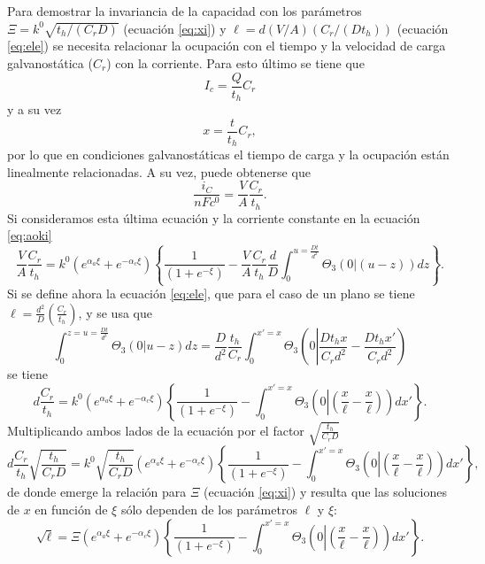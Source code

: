 Para demostrar la invariancia de la capacidad con los parámetros 
$\Xi = k^0 \sqrt{t_h / (C_r D)}$ (ecuación \ref{eq:xi}) y 
$\ell = d (V/A) (C_r / (D t_h))$ (ecuación \ref{eq:ele}) se necesita relacionar 
la ocupación con el tiempo y la velocidad de carga galvanostática ($C_r$) con
la corriente. Para esto último se tiene que
\begin{equation}
    I_c = \frac{Q}{t_h} C_r
\end{equation}
y a su vez
\begin{equation}
    x = \frac{t}{t_h} C_r,
\end{equation}
por lo que en condiciones galvanostáticas el tiempo de carga y la ocupación 
están linealmente relacionadas. A su vez, puede obtenerse que
\begin{equation}
    \frac{i_C}{nFc^0} = \frac{V}{A} \frac{C_r}{t_h}.
\end{equation}
Si consideramos esta última ecuación y la corriente constante en la ecuación 
\ref{eq:aoki}
\begin{equation}
    \frac{V}{A} \frac{C_r}{t_h} = k^0 (e^{\alpha_a \xi} + e^{-\alpha_c \xi}) \left\{ \frac{1}{(1 + e^{-\xi})} - \frac{V}{A}\frac{C_r}{t_h}\frac{d}{D} \int_0^{u=\frac{Dt}{d^2}} \Theta_3\left(0 \left| (u - z)\right.\right) dz \right\}.
\end{equation}
Si se define ahora la ecuación \ref{eq:ele}, que para el caso de un plano se tiene
$\ell = \frac{d^2}{D} \left(\frac{C_r}{t_h}\right)$, y se usa que
\begin{equation}
    \int_0^{z=u=\frac{Dt}{d^3}} \Theta_3(0|u-z)dz = \frac{D}{d^2} \frac{t_h}{C_r} \int_0^{x'=x} \Theta_3\left(0\left|\frac{D t_h x}{C_r d^2} - \frac{D t_h x'}{C_r d^2}\right.\right)
\end{equation}
se tiene
\begin{equation}
    d \frac{C_r}{t_h} = k^0 (e^{\alpha_a \xi} + e^{-\alpha_c \xi}) \left\{ \frac{1}{(1 + e^{-\xi})} - \int_0^{x'=x} \Theta_3\left(0 \left| \left(\frac{x}{\ell}- \frac{x}{\ell}\right)\right.\right) dx' \right\}.
\end{equation}
Multiplicando ambos lados de la ecuación por el factor $\sqrt{\frac{t_h}{C_r D}}$
\begin{equation}
    d \frac{C_r}{t_h} \sqrt{\frac{t_h}{C_r D}} = k^0 \sqrt{\frac{t_h}{C_r D}} (e^{\alpha_a \xi} + e^{-\alpha_c \xi}) \left\{ \frac{1}{(1 + e^{-\xi})} - \int_0^{x'=x} \Theta_3\left(0 \left| \left(\frac{x}{\ell}- \frac{x}{\ell}\right)\right.\right) dx' \right\},
\end{equation}
de donde emerge la relación para $\Xi$ (ecuación \ref{eq:xi}) y resulta que las 
soluciones de $x$ en función de $\xi$ sólo dependen de los parámetros $\ell$ y
$\xi$:
\begin{equation}
    \sqrt{\ell} = \Xi (e^{\alpha_a \xi} + e^{-\alpha_c \xi}) \left\{ \frac{1}{(1 + e^{-\xi})} - \int_0^{x'=x} \Theta_3\left(0 \left| \left(\frac{x}{\ell}- \frac{x}{\ell}\right)\right.\right) dx' \right\}.
\end{equation}
